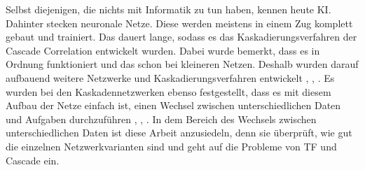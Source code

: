 
Selbst diejenigen, die nichts mit Informatik zu tun haben, kennen heute KI. 
Dahinter stecken neuronale Netze. Diese werden meistens in einem Zug komplett gebaut und trainiert. 
Das dauert lange, sodass es das Kaskadierungsverfahren der Cascade Correlation \cite{cascor} entwickelt wurden. 
Dabei wurde bemerkt, dass es in Ordnung funktioniert und das schon bei kleineren Netzen. Deshalb wurden darauf aufbauend 
weitere Netzwerke und Kaskadierungsverfahren entwickelt \cite{cascade_network_architectures}, \cite{Constructive_Cascade}, 
\cite{deep_cascade_learning}. Es wurden bei den Kaskadennetzwerken ebenso festgestellt, dass es mit diesem Aufbau der Netze 
einfach ist, einen Wechsel zwischen unterschiedlichen Daten und Aufgaben durchzuführen \cite{phd_deep_cascade}, \cite{transfer_learning}, 
\cite{survey_transfer}. In dem Bereich des Wechsels zwischen unterschiedlichen Daten ist diese Arbeit anzusiedeln, denn sie überprüft, wie 
gut die einzelnen Netzwerkvarianten sind und geht auf die Probleme von TF und Cascade ein. 




